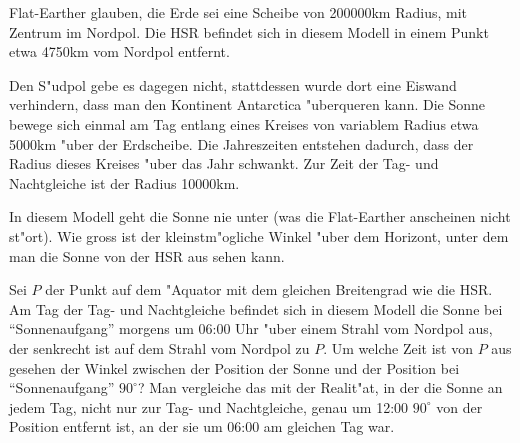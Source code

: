Flat-Earther glauben, die Erde sei eine Scheibe von 200000km Radius,
mit Zentrum im Nordpol.
Die HSR befindet sich in diesem Modell in einem Punkt etwa 4750km
vom Nordpol entfernt.

Den S"udpol gebe es dagegen nicht, stattdessen wurde dort eine Eiswand
verhindern, dass man den Kontinent Antarctica "uberqueren kann.
Die Sonne bewege sich einmal am Tag entlang eines Kreises von variablem
Radius etwa 5000km "uber der Erdscheibe.
Die Jahreszeiten entstehen dadurch, dass der Radius dieses Kreises
"uber das Jahr schwankt.
Zur Zeit der Tag- und Nachtgleiche ist der Radius 10000km.

\begin{teilaufgaben}
\item
In diesem Modell geht die Sonne nie unter (was die Flat-Earther anscheinen
nicht st"ort).
Wie gross ist der kleinstm"ogliche Winkel "uber dem Horizont, unter dem
man die Sonne von der HSR aus sehen kann.
\item
Sei $P$ der Punkt auf dem "Aquator mit dem gleichen Breitengrad wie
die HSR.
Am Tag der Tag- und Nachtgleiche befindet sich in diesem Modell
die Sonne bei ``Sonnenaufgang'' morgens um 06:00 Uhr "uber einem Strahl
vom Nordpol aus, der senkrecht ist auf dem Strahl vom Nordpol zu $P$.
Um welche Zeit ist von $P$ aus gesehen der Winkel zwischen der Position
der Sonne und der Position bei ``Sonnenaufgang'' $90^\circ$?
Man vergleiche das mit der Realit"at, in der die Sonne an jedem Tag,
nicht nur zur Tag- und Nachtgleiche, genau um 12:00 
$90^\circ$ von der Position entfernt ist, an der sie um 06:00 am
gleichen Tag war.
\end{teilaufgaben}

